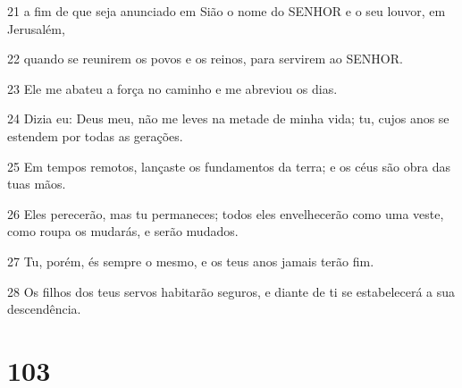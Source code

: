 \par 21 a fim de que seja anunciado em Sião o nome do SENHOR e o seu louvor, em Jerusalém,
\par 22 quando se reunirem os povos e os reinos, para servirem ao SENHOR.
\par 23 Ele me abateu a força no caminho e me abreviou os dias.
\par 24 Dizia eu: Deus meu, não me leves na metade de minha vida; tu, cujos anos se estendem por todas as gerações.
\par 25 Em tempos remotos, lançaste os fundamentos da terra; e os céus são obra das tuas mãos.
\par 26 Eles perecerão, mas tu permaneces; todos eles envelhecerão como uma veste, como roupa os mudarás, e serão mudados.
\par 27 Tu, porém, és sempre o mesmo, e os teus anos jamais terão fim.
\par 28 Os filhos dos teus servos habitarão seguros, e diante de ti se estabelecerá a sua descendência.

\chapter{103}

